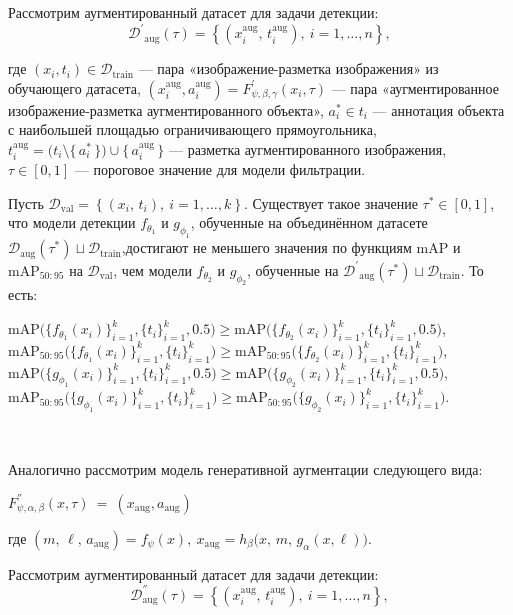 Рассмотрим аугментированный датасет для задачи детекции:
\[
\mathcal{D^{'}}_{\text{aug}}(\tau) =
\left\{
  (x_i^{\text{aug}},\,t_i^{\text{aug}}), \
  i = 1,\dots,n
\right\},
\]

где $(x_i, t_i) \in \mathcal{D}_{\mathrm{train}}$ — пара «изображение-разметка изображения» из обучающего датасета,
$(x_i^{\mathrm{aug}}, a_i^{\mathrm{aug}}) = F^{'}_{\psi,\beta,\gamma}(x_i, \tau)$ — пара «аугментированное изображение-разметка аугментированного объекта»,
$a_i^* \in t_i$ — аннотация объекта с наибольшей площадью ограничивающего прямоугольника,
$t_i^{\mathrm{aug}} = \bigl(t_i \setminus \{\,a_i^*\,\}\bigr) \cup \{\,a_i^{\mathrm{aug}}\,\}$ — разметка аугментированного изображения,
$\tau \in [0,1]$ — пороговое значение для модели фильтрации.
\begin{statement2}
Пусть $\mathcal{D}_{\text{val}} =
\left\{
  (x_i,\,t_i), \
  i = 1,\dots,k
\right\}$. Существует такое значение $\tau^*\in[0,1]$, что модели детекции $f_{\theta_1}$ и $g_{\phi_1}$, обученные на объединённом датасете $\mathcal{D}_{\mathrm{aug}}(\tau^*)\sqcup\mathcal{D}_{\mathrm{train}}$,достигают не меньшего значения по функциям $\mathrm{mAP}$ и $\mathrm{mAP}_{50:95}$ на $\mathcal{D}_{\text{val}}$, чем модели $f_{\theta_2}$ и $g_{\phi_2}$, обученные на $\mathcal{D^{'}}_{\text{aug}}(\tau^{*}) \sqcup \mathcal{D}_{\text{train}}$. То есть:
\begin{center}
$\mathrm{mAP}\bigl(\{f_{\theta_1}(x_i)\}_{i=1}^k,\{t_i\}_{i=1}^k,0.5\bigr)\ge\mathrm{mAP}\bigl(\{f_{\theta_2}(x_i)\}_{i=1}^k,\{t_i\}_{i=1}^k,0.5\bigr)$,  
$\mathrm{mAP}_{50:95}\bigl(\{f_{\theta_1}(x_i)\}_{i=1}^k,\{t_i\}_{i=1}^k\bigr)\ge\mathrm{mAP}_{50:95}\bigl(\{f_{\theta_2}(x_i)\}_{i=1}^k,\{t_i\}_{i=1}^k\bigr)$,  
$\mathrm{mAP}\bigl(\{g_{\phi_1}(x_i)\}_{i=1}^k,\{t_i\}_{i=1}^k,0.5\bigr)\ge\mathrm{mAP}\bigl(\{g_{\phi_2}(x_i)\}_{i=1}^k,\{t_i\}_{i=1}^k,0.5\bigr)$,  
$\mathrm{mAP}_{50:95}\bigl(\{g_{\phi_1}(x_i)\}_{i=1}^k,\{t_i\}_{i=1}^k\bigr)\ge\mathrm{mAP}_{50:95}\bigl(\{g_{\phi_2}(x_i)\}_{i=1}^k,\{t_i\}_{i=1}^k\bigr)$.
\end{center}
\
\end{statement2}
Аналогично рассмотрим модель генеративной аугментации следующего вида:
\begin{center}
$F^{''}_{\psi,\alpha,\beta}(x, \tau) \ = \ (x_{\text{aug}}, a_{\text{aug}})$
\end{center}
где 
$ 
(m,\,\ell,\, a_{\text{aug}}) = f_{\psi}(x),  \ x_{\text{aug}} = h_{\beta}\bigl(x,\,m,\,g_{\alpha}(x, \ell)\bigr)$.

Рассмотрим аугментированный датасет для задачи детекции:
\[
\mathcal{D}^{''}_{\text{aug}}(\tau) =
\left\{
  (x_i^{\text{aug}},\,t_i^{\text{aug}}), \
  i = 1,\dots,n
\right\},
\]

